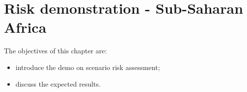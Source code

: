 \documentclass[11pt,a4paper,headings=small,dvips]{scrbook}
\newenvironment{myfancybox}{%
  \def\FrameCommand{\fboxsep=\FrameSep \fcolorbox{blue01}{honeydew}}%
  \color{black}\MakeFramed {\FrameRestore}}%
 {\endMakeFramed}
\begin{document}
\chapter{Risk demonstration - Sub-Saharan Africa}
\begin{myfancybox}
The objectives of this chapter are:
\begin{itemize}
    \item introduce the demo on scenario risk assessment;
    \item discuss the expected results.
\end{itemize}
\end{myfancybox}
    
\cleardoublepage
\cleardoublepage


\cleardoublepage
\end{document}
